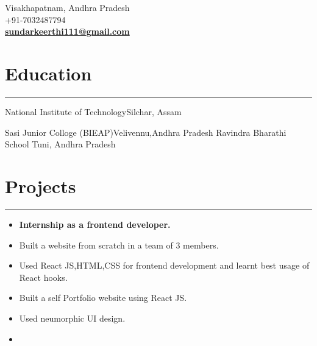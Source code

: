 \documentclass[]{rahulworld-resume}
\begin{document}
\begin{minipage}[t]{0.66\textwidth} 
\hspace*{0pt}\hfill    \\
\hspace*{0pt}\hfill    \\
\hspace*{0pt}\hfill \faMapMarker \enspace Visakhapatnam, Andhra Pradesh \\
\hspace*{0pt}\hfill \faMobile \enspace +91-7032487794 \\
\hspace*{0pt}\hfill \faEnvelopeO \enspace\textbf{\href{mailto: sundarkeerthi111@gmail.com}{sundarkeerthi111@gmail.com}} \\


\section{Education}
\noindent\rule{12.5cm}{0.4pt}
        {National Institute of Technology}{Silchar, Assam}

        {Sasi Junior Colloge (BIEAP)}{Velivennu,Andhra Pradesh}
        {Ravindra Bharathi School }{Tuni, Andhra Pradesh}


\section{Projects}
\noindent\rule{12.5cm}{0.4pt}


{
 {\begin{itemize}
   \item \textbf{Internship as a frontend developer.}
    \item Built a website from scratch in a team of 3 members.
    \item  Used React JS,HTML,CSS for frontend development and learnt best usage of React hooks.
  \end{itemize}
  }
}
{
{\begin{itemize}
  \item Built  a self Portfolio website using React JS. 
  \item Used neumorphic UI design.
  \item {}
\end{itemize}
}
}




\end{minipage}
\end{document}
